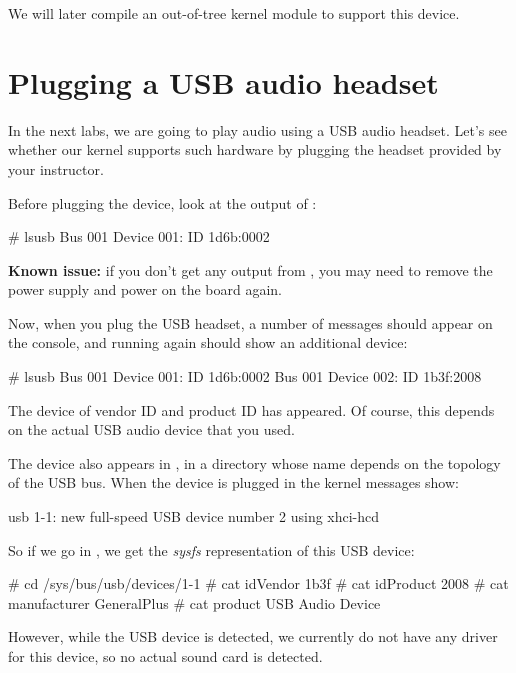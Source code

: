 We will later compile an out-of-tree kernel module to support this device.

\section{Plugging a USB audio headset}

In the next labs, we are going to play audio using a USB audio headset.
Let's see whether our kernel supports such hardware by plugging the
headset provided by your instructor.

Before plugging the device, look at the output of :

\begin{bashinput}
# lsusb
Bus 001 Device 001: ID 1d6b:0002
\end{bashinput}

{\bf Known issue:} if you don't get any output from ,
you may need to remove the power supply and power on the board
again.

Now, when you plug the USB headset, a number of messages should appear
on the console, and running  again should show an
additional device:

\begin{bashinput}
# lsusb
Bus 001 Device 001: ID 1d6b:0002
Bus 001 Device 002: ID 1b3f:2008
\end{bashinput}

The device of vendor ID  and product ID  has
appeared. Of course, this depends on the actual USB audio device
that you used.

The device also appears in , in a
directory whose name depends on the topology of the USB bus. When the
device is plugged in the kernel messages show:

\begin{bashinput}
usb 1-1: new full-speed USB device number 2 using xhci-hcd
\end{bashinput}

So if we go in , we get the {\em
sysfs} representation of this USB device:

\begin{bashinput}
# cd /sys/bus/usb/devices/1-1
# cat idVendor
1b3f
# cat idProduct
2008
# cat manufacturer
GeneralPlus
# cat product
USB Audio Device
\end{bashinput}

However, while the USB device is detected, we currently do not have
any driver for this device, so no actual sound card is detected.

